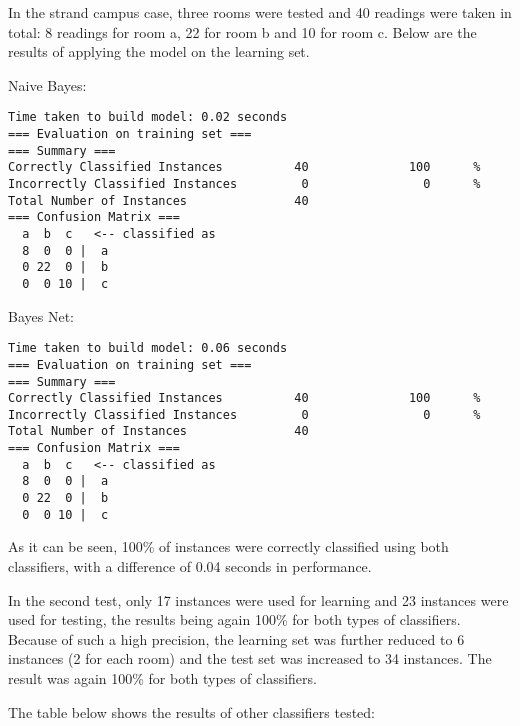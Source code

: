 In the strand campus case, three rooms were tested and 40 readings were taken in total: 8 readings for room a, 22 for room b and 10 for room c. Below are the results of applying the model on the learning set.

\noindent Naive Bayes:
\begin{lstlisting}
Time taken to build model: 0.02 seconds
=== Evaluation on training set ===
=== Summary ===
Correctly Classified Instances          40              100      %
Incorrectly Classified Instances         0                0      %
Total Number of Instances               40     
=== Confusion Matrix ===
  a  b  c   <-- classified as
  8  0  0 |  a
  0 22  0 |  b
  0  0 10 |  c
\end{lstlisting}

\noindent Bayes Net:
\begin{lstlisting}
Time taken to build model: 0.06 seconds
=== Evaluation on training set ===
=== Summary ===
Correctly Classified Instances          40              100      %
Incorrectly Classified Instances         0                0      %
Total Number of Instances               40     
=== Confusion Matrix ===
  a  b  c   <-- classified as
  8  0  0 |  a
  0 22  0 |  b
  0  0 10 |  c
\end{lstlisting}
As it can be seen, 100\% of instances were correctly classified using both classifiers, with a difference of 0.04 seconds in performance. 

In the second test, only 17 instances were used for learning and 23 instances were used for testing, the results being again 100\% for both types of classifiers. Because of such a high precision, the learning set was further reduced to 6 instances (2 for each room) and  the test set was increased to 34 instances. The result was again 100\% for both types of classifiers.

The table below shows the results of other classifiers tested:

